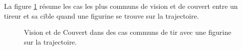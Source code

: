 La figure \ref{figure/line_of_sight_and_cover} résume les cas les plus communs de vision et de couvert entre un tireur et sa cible quand une figurine se trouve sur la trajectoire.

\newcommand{\figureLoSCSoftcover}{\Largefontsize{Couvert Léger}}
\newcommand{\figureLoSCHardcover}{\Largefontsize{Couvert Lourd}}
\newcommand{\figureLoSCNocover}{\Largefontsize{Pas de Couvert}}
\newcommand{\figureLoSCNolineofsight}{\Largefontsize{Pas de Ligne de Vue}}
\newcommand{\figureLoSCSmall}{Petit}
\newcommand{\figureLoSCMedium}{Moyen}
\newcommand{\figureLoSCLarge}{Grand}

\begin{figure}[!htbp]
\centering
\def\svgwidth{12cm}

\caption{Vision et de Couvert dans des cas communs de tir avec une figurine sur la trajectoire.}
\label{figure/line_of_sight_and_cover}
\end{figure}

